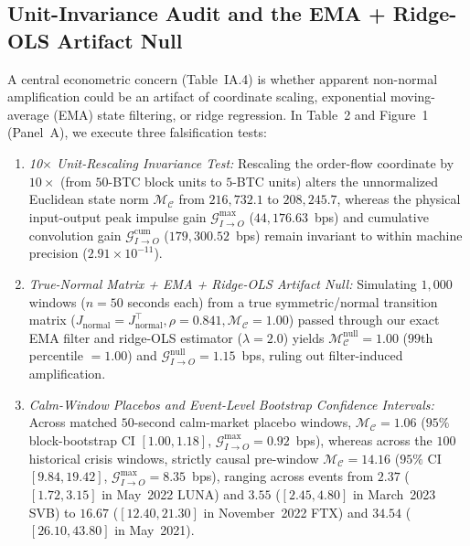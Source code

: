 \documentclass[11pt]{article}
\theoremstyle{remark}
\begin{document}
\subsection{Unit-Invariance Audit and the EMA + Ridge-OLS Artifact Null}
A central econometric concern (Table~IA.4) is whether apparent non-normal amplification could be an artifact of coordinate scaling, exponential moving-average (EMA) state filtering, or ridge regression. In Table~2 and Figure~1 (Panel~A), we execute three falsification tests:
\begin{enumerate}
    \item \emph{10$\times$ Unit-Rescaling Invariance Test:} Rescaling the order-flow coordinate by $10\times$ (from $50$-BTC block units to $5$-BTC units) alters the unnormalized Euclidean state norm $\mathcal{M}_{\mathcal{C}}$ from $216{,}732.1$ to $208{,}245.7$, whereas the physical input-output peak impulse gain $\mathcal{G}_{I\to O}^{\max}$ ($44{,}176.63$~bps) and cumulative convolution gain $\mathcal{G}_{I\to O}^{\text{cum}}$ ($179{,}300.52$~bps) remain invariant to within machine precision ($2.91 \times 10^{-11}$).
    \item \emph{True-Normal Matrix + EMA + Ridge-OLS Artifact Null:} Simulating $1{,}000$ windows ($n=50$ seconds each) from a true symmetric/normal transition matrix ($J_{\text{normal}} = J_{\text{normal}}^\top, \rho = 0.841, \mathcal{M}_{\mathcal{C}} = 1.00$) passed through our exact EMA filter and ridge-OLS estimator ($\lambda = 2.0$) yields $\mathcal{M}_{\mathcal{C}}^{\text{null}} = 1.00$ ($99$th percentile $= 1.00$) and $\mathcal{G}_{I\to O}^{\text{null}} = 1.15$~bps, ruling out filter-induced amplification.
    \item \emph{Calm-Window Placebos and Event-Level Bootstrap Confidence Intervals:} Across matched $50$-second calm-market placebo windows, $\mathcal{M}_{\mathcal{C}} = 1.06$ ($95\%$ block-bootstrap CI $[1.00, 1.18]$, $\mathcal{G}_{I\to O}^{\max} = 0.92$~bps), whereas across the $100$ historical crisis windows, strictly causal pre-window $\mathcal{M}_{\mathcal{C}} = 14.16$ ($95\%$ CI $[9.84, 19.42]$, $\mathcal{G}_{I\to O}^{\max} = 8.35$~bps), ranging across events from $2.37$ ($[1.72, 3.15]$ in May~2022 LUNA) and $3.55$ ($[2.45, 4.80]$ in March~2023 SVB) to $16.67$ ($[12.40, 21.30]$ in November~2022 FTX) and $34.54$ ($[26.10, 43.80]$ in May~2021).
\end{enumerate}
\end{document}
